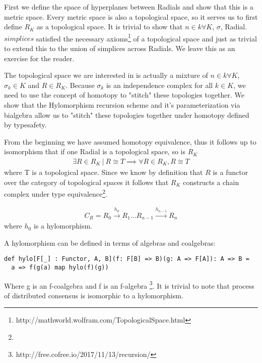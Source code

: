 \documentclass{article}
\begin{document}
First we define the space of hyperplanes between Radials and show that this is a metric space. Every metric space is also a topological space, so it serves us to first define $R_K$ as a topological space. It is trivial to show that $n \in k \forall K$, $\sigma$, Radial.$simplices$ satisfied the necessary axioms\footnote{http://mathworld.wolfram.com/TopologicalSpace.html} of a topological space and just as trivial to extend this to the union of simplices across Radials. We leave this as an exercise for the reader. 

The topological space we are interested in is actually a mixture of $n \in k \forall K$, $\sigma_k \in K$ and $R \in R_K$. Because $\sigma_k$ is an independence complex for all $k \in K$, we need to use the concept of homotopy to "stitch" these topologies together. We show that the Hylomorphism recursion scheme and it's parameterization via bialgebra allow us to "stitch" these topologies together under homotopy defined by typesafety.

From the beginning we have assumed homotopy equivalence, thus it follows up to isomorphism that if one Radial is a topological space, so is $R_K$
\begin{equation} \label{eq1}
\begin{split}
\exists R \in R_K \ | \ R \cong T \implies \forall R \in R_K,  R \cong T
\end{split}
\end{equation}
where T is a topological space. Since we know by definition that $R$ is a functor over the category of topological spaces it follows that $R_K$ constructs a chain complex under type equivalence\footnote{}. 

\begin{equation} \label{eq1}
\begin{split}
C_R = R_{0}{\xrightarrow {h_{0}}}R_{1} \dots R_{n-1}{\xrightarrow {h_{n-1}}}R_{n}
\end{split}
\end{equation}
where $h_{0}$ is a hylomorphism.

A hylomorphism can be defined in terms of algebras and coalgebras:
\begin{lstlisting}
def hylo[F[_] : Functor, A, B](f: F[B] => B)(g: A => F[A]): A => B =
  a => f(g(a) map hylo(f)(g))
\end{lstlisting}
Where g is an f-coalgebra and f is an f-algebra \footnote{http://free.cofree.io/2017/11/13/recursion/}. It is trivial to note that process of distributed consensus is isomorphic to a hylomorphism. 
\end{document}
